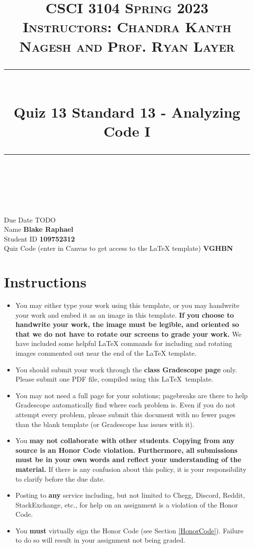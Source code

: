 \documentclass[11pt]{article}
\title{
\normalfont \normalsize 
\textsc{CSCI 3104 Spring 2023 \\ 
Instructors: Chandra Kanth Nagesh and Prof. Ryan Layer} \\
[10pt] 
\rule{\linewidth}{0.5pt} \\[6pt] 
\huge Quiz 13 Standard 13 - Analyzing Code I \\
\rule{\linewidth}{2pt}  \\[10pt]
}
\date{}
\theoremstyle{definition}
\theoremstyle{definition}
\theoremstyle{definition}
\begin{document}

\maketitle


\noindent
Due Date \dotfill TODO \\
Name \dotfill \textbf{Blake Raphael} \\
Student ID \dotfill \textbf{109752312} \\
Quiz Code (enter in Canvas to get access to the LaTeX template) \dotfill \textbf{VGHBN}


\tableofcontents

\section*{Instructions}
 \begin{itemize}
	\item You may either type your work using this template, or you may handwrite your work and embed it as an image in this template. \textbf{If you choose to handwrite your work, the image must be legible, and oriented so that we do not have to rotate our screens to grade your work.} We have included some helpful LaTeX commands for including and rotating images commented out near the end of the LaTeX template.
	\item You should submit your work through the \textbf{class Gradescope page} only. Please submit one PDF file, compiled using this \LaTeX \ template.
	\item You may not need a full page for your solutions; pagebreaks are there to help Gradescope automatically find where each problem is. Even if you do not attempt every problem, please submit this document with no fewer pages than the blank template (or Gradescope has issues with it).

	\item You \textbf{may not collaborate with other students}. \textbf{Copying from any source is an Honor Code violation. Furthermore, all submissions must be in your own words and reflect your understanding of the material.} If there is any confusion about this policy, it is your responsibility to clarify before the due date. 

	\item Posting to \textbf{any} service including, but not limited to Chegg, Discord, Reddit, StackExchange, etc., for help on an assignment is a violation of the Honor Code.

	\item You \textbf{must} virtually sign the Honor Code (see Section \ref{HonorCode}). Failure to do so will result in your assignment not being graded.
\end{itemize}
\end{document}

